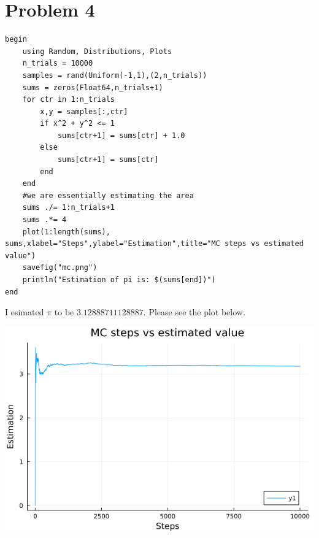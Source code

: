 \documentclass[11pt]{article}
\begin{document}
\section{Problem 4}
\label{sec:orgf79e9c3}
\begin{verbatim}
begin
    using Random, Distributions, Plots
    n_trials = 10000
    samples = rand(Uniform(-1,1),(2,n_trials))
    sums = zeros(Float64,n_trials+1)
    for ctr in 1:n_trials
        x,y = samples[:,ctr]
        if x^2 + y^2 <= 1
            sums[ctr+1] = sums[ctr] + 1.0
        else
            sums[ctr+1] = sums[ctr]
        end
    end
    #we are essentially estimating the area
    sums ./= 1:n_trials+1
    sums .*= 4
    plot(1:length(sums), sums,xlabel="Steps",ylabel="Estimation",title="MC steps vs estimated value")
    savefig("mc.png")
    println("Estimation of pi is: $(sums[end])")
end
\end{verbatim}

I esimated \(\pi\) to be \(3.12888711128887\). Please see the plot below.

\begin{center}
\includegraphics[width=.9\linewidth]{./mc.png}
\end{center}
\end{document}
